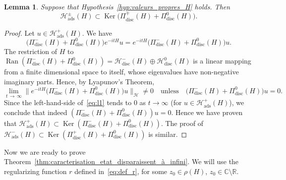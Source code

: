 \documentclass[10pt]{amsart}
\newtheorem{lemm}[theo]{Lemma}\newtheorem{prop}[theo]{Proposition}\newtheorem{coro}[theo]{Corollary}\newtheorem{conj}[theo]{Conjecture}
\theoremstyle{definition}\newtheorem{defi}[theo]{Definition}\newtheorem{rema}[theo]{Remark}\newtheorem{exam}[theo]{Example}\newtheorem{exem}[theo]{Example}\newtheorem{nota}[theo]{Notation}
\newcommand{\Hi}{\mathcal{H}}
\newcommand{\bbC}{\mathbb{C}}
\newcommand{\R}{\mathbb{R}}
\newcommand{\ads}{\mathrm{ads}}
\newcommand{\disc}{\mathrm{disc}}
\DeclareMathOperator{\Ran}{Ran}
\DeclareMathOperator{\Ker}{Ker}
\begin{document}
\begin{lemm}\label{lm:incl}
Suppose that Hypothesis~\ref{hyp:valeurs_propres_H} holds. Then
\begin{equation*}
\Hi_\ads^\pm(H)\subset \Ker\big(\Pi_{\disc}^\mp(H)+\Pi_{\disc}^0(H)\big).
\end{equation*}
\end{lemm}

\begin{proof}
Let $u\in \Hi_\ads^+(H)$. We have
\begin{equation}\label{eq:l1}
\big(\Pi_{\disc}^-(H)+\Pi_{\disc}^0(H)\big)e^{-itH}u=e^{-itH}\big(\Pi_{\disc}^-(H)+\Pi_{\disc}^0(H)\big)u.
\end{equation}
The restriction of $H$ to $\Ran(\Pi_{\disc}^-(H)+\Pi_{\disc}^0(H))=\Hi_{\disc}^-(H)\oplus\Hi_{\disc}^0(H)$ is a linear mapping from a finite dimensional space to itself, whose eigenvalues have non-negative imaginary parts. Hence, by Lyapunov's Theorem,
\begin{equation*}
\lim_{t\,\to\,\infty}\big\|e^{-itH}\big(\Pi_{\disc}^-(H)+\Pi_{\disc}^0(H)\big)u\big\|_\Hi\neq0 \quad \text{unless}\quad \big(\Pi_{\disc}^-(H)+\Pi_{\disc}^0(H)\big)u=0.
\end{equation*}
Since the left-hand-side of~\eqref{eq:l1} tends to $0$ as $t\to\infty$ (for $u\in \Hi_\ads^+(H)$), we conclude that indeed $(\Pi_{\disc}^-(H)+\Pi_{\disc}^0(H))u=0$. Hence we have proven that $\Hi_\ads^+(H)\subset \Ker(\Pi_{\disc}^-(H)+\Pi_{\disc}^0(H))$. The proof of $\Hi_\ads^-(H)\subset \Ker(\Pi_{\disc}^+(H)+\Pi_{\disc}^0(H))$ is similar.
\end{proof}

Now we are ready to prove Theorem~\ref{thm:caracterisation_etat_disparaissent_à_infini}. We will use the regularizing function $r$ defined in~\eqref{eq:def_r}, for some $z_0\in\rho(H)$, $z_0\in\bbC\setminus\R$.
\end{document}
